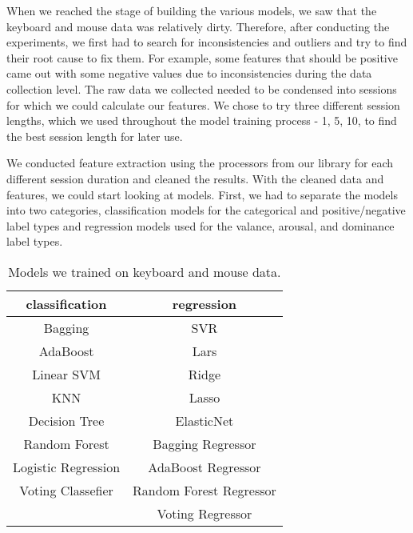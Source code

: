     When we reached the stage of building the various models, we saw that the keyboard and mouse data was relatively dirty. 
    Therefore, after conducting the experiments, we first had to search for inconsistencies and outliers and try to find their root cause to fix them. 
    For example, some features that should be positive came out with some negative values due to inconsistencies during the data collection level.
    The raw data we collected needed to be condensed into sessions for which we could calculate our features. We chose to try three different session lengths, 
    which we used throughout the model training process - 1, 5, 10, to find the best session length for later use.
    
    We conducted feature extraction using the processors from our library for each different session duration and cleaned the results. 
    With the cleaned data and features, we could start looking at models. First, we had to separate the models into two categories, 
    classification models for the categorical and positive/negative label types and regression models used for the valance, arousal, and dominance label types.

    \begin{table}[htp]
        \centering
        \begin{tabular}{cc}
            \toprule
            classification      & regression              \\ \midrule
            Bagging             & SVR                     \\
            AdaBoost            & Lars                    \\
            Linear SVM          & Ridge                   \\
            KNN                 & Lasso                   \\
            Decision Tree       & ElasticNet              \\
            Random Forest       & Bagging Regressor       \\
            Logistic Regression & AdaBoost Regressor      \\
            Voting Classefier   & Random Forest Regressor \\
                                & Voting Regressor        \\ \bottomrule
            \end{tabular}            
            \caption{Models we trained on keyboard and mouse data.}
            \label{table:classic_models}
    \end{table}

